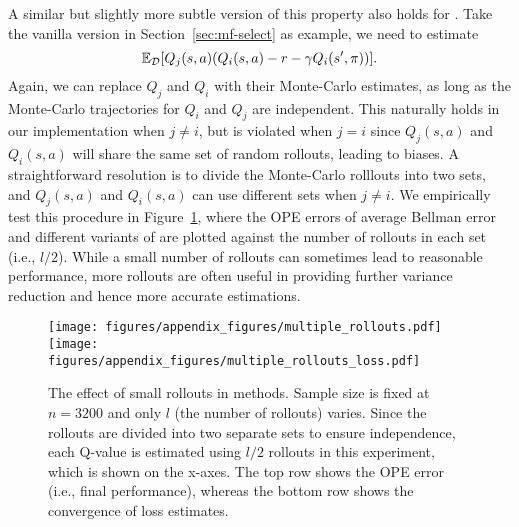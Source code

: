 A similar but slightly more subtle version of this property also holds for \lstd. Take the vanilla version in Section~\ref{sec:mf-select} as example, we need to estimate
$$
\mathbb{E}_{\mathcal{D}}[Q_j(s,a)(Q_i(s,a) - r - \gamma Q_i(s',\pi))].
$$
Again, we can replace $Q_j$ and $Q_i$ with their Monte-Carlo estimates, as long as the Monte-Carlo trajectories for $Q_i$ and $Q_j$ are independent. This naturally holds in our implementation when $j\ne i$, but is violated when $j=i$ since $Q_j(s,a)$ and $Q_i(s,a)$ will share the same set of random rollouts, leading to biases. A straightforward resolution is to divide the Monte-Carlo rolllouts into two sets, and $Q_j(s,a)$ and $Q_i(s,a)$ can use different sets when $j\ne i$. We empirically test this procedure in Figure~\ref{fig:rollouts}, where the OPE errors of average Bellman error and different variants of \lstd are plotted against the number of rollouts in each set (i.e., $l/2$). While a small number of rollouts can sometimes lead to reasonable performance, more rollouts are often useful in providing further variance reduction and hence more accurate estimations.   %


\begin{figure}[H]
    \centering
\texttt{[image: figures/appendix\_figures/multiple\_rollouts.pdf]}
    \texttt{[image: figures/appendix\_figures/multiple\_rollouts\_loss.pdf]}
    \caption{The effect of small rollouts in \lstd methods. Sample size is fixed at $n=3200$ and only $l$ (the number of rollouts) varies. Since the rollouts are divided into two separate sets to ensure independence, each Q-value is estimated using $l/2$ rollouts in this experiment, which is shown on the x-axes. The top row shows the OPE error (i.e., final performance), whereas the bottom row shows the convergence of loss estimates. \label{fig:rollouts}}
\end{figure}

\begin{comment}
\subsection{Linearity Between Bellman Error and J Error}
\begin{figure}[H]
    \centering
    \texttt{[image: figures/appendix\_figures/occupancy.pdf]}
    \caption{Linearity}
\end{figure}
\end{comment}